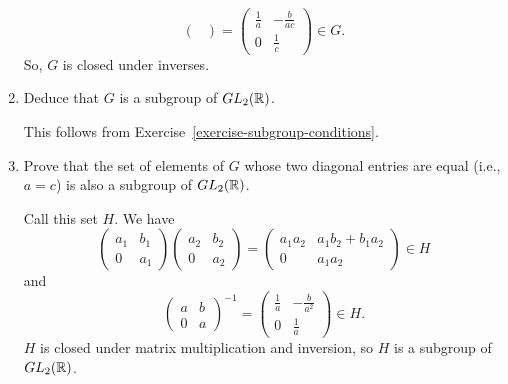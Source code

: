 \begin{enumerate}
\begin{solution}
\begin{equation*}
\begin{pmatrix}
      \end{pmatrix}
      =
      \begin{pmatrix}
        \frac1a & -\frac{b}{ac} \\[3pt]
        0 & \frac1c
      \end{pmatrix} \in G.
    \end{equation*}
    So, $G$ is closed under inverses.
  \end{solution}
\item Deduce that $G$ is a subgroup of $GL_2(\mathbb{R})$.
  \begin{solution}
    This follows from Exercise~\ref{exercise-subgroup-conditions}.
  \end{solution}
\item Prove that the set of elements of $G$ whose two diagonal entries
  are equal (i.e., $a = c$) is also a subgroup of $GL_2(\mathbb{R})$.
  \begin{solution}
    Call this set $H$. We have
    \begin{equation*}
      \begin{pmatrix}
        a_1 & b_1 \\ 0 & a_1
      \end{pmatrix}
      \begin{pmatrix}
        a_2 & b_2 \\ 0 & a_2
      \end{pmatrix}
      =
      \begin{pmatrix}
        a_1a_2 & a_1b_2 + b_1a_2 \\
        0 & a_1a_2
      \end{pmatrix}
      \in H
    \end{equation*}
    and
    \begin{equation*}
      \begin{pmatrix}
        a & b \\ 0 & a
      \end{pmatrix}^{-1}
      =
      \begin{pmatrix}
        \frac1a & -\frac{b}{a^2} \\[3pt]
        0 & \frac1a
      \end{pmatrix}
      \in H.
    \end{equation*}
    $H$ is closed under matrix multiplication and inversion, so $H$ is
    a subgroup of $GL_2(\mathbb{R})$.
  \end{solution}
\end{enumerate}


